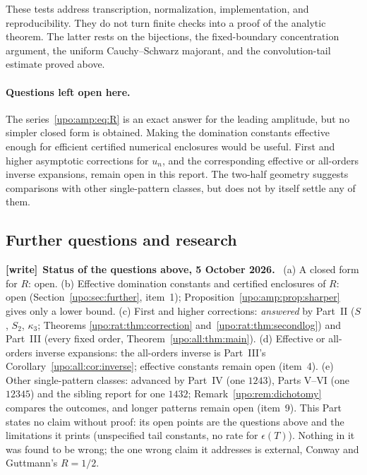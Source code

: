 \documentclass[11pt,letterpaper]{article}
\theoremstyle{remark}\newtheorem{remark}[theorem]{Remark}
\numberwithin{equation}{section}
\newenvironment{writenote}[1][]{\par\smallskip\begingroup\small
 \noindent\textbf{[write]}\if\relax\detokenize{#1}\relax\else~\textbf{#1.}\fi\ }%
 {\par\endgroup\smallskip}
\begin{document}
These tests address transcription, normalization, implementation, and
reproducibility. They do not turn finite checks into a proof of the
analytic theorem. The latter rests on the bijections, the fixed-boundary
concentration argument, the uniform Cauchy--Schwarz majorant, and the
convolution-tail estimate proved above.

\paragraph{Questions left open here.}
The series~\eqref{upo:amp:eq:R} is an exact answer for the leading amplitude,
but no simpler closed form is obtained. Making the domination constants
effective enough for efficient certified numerical enclosures would be
useful. First and higher asymptotic corrections for $u_n$, and the
corresponding effective or all-orders inverse expansions, remain open
in this report. The two-half geometry suggests comparisons with other
single-pattern classes, but does not by itself settle any of them.
\subsection{Further questions and research}\label{upo:amp:sub:further}
\begin{writenote}[Status of the questions above, 5 October 2026]
(a) A closed form for $R$: open. (b) Effective domination constants and certified enclosures of $R$: open (Section~\ref{upo:sec:further}, item~1); Proposition~\ref{upo:amp:prop:sharper} gives only a lower bound. (c) First and higher corrections: \emph{answered} by Part~II ($S$, $S_2$, $\kappa_3$; Theorems \ref{upo:rat:thm:correction} and~\ref{upo:rat:thm:secondlog}) and Part~III (every fixed order, Theorem~\ref{upo:all:thm:main}). (d) Effective or all-orders inverse expansions: the all-orders inverse is Part~III's Corollary~\ref{upo:all:cor:inverse}; effective constants remain open (item~4). (e) Other single-pattern classes: advanced by Part~IV (one $1243$), Parts V--VI (one $12345$) and the sibling report for one $1432$; Remark~\ref{upo:rem:dichotomy} compares the outcomes, and longer patterns remain open (item~9). This Part states no claim without proof: its open points are the questions above and the limitations it prints (unspecified tail constants, no rate for $\epsilon(T)$). Nothing in it was found to be wrong; the one wrong claim it addresses is external, Conway and Guttmann's $R=1/2$.
\end{writenote}

\clearpage
\end{document}
